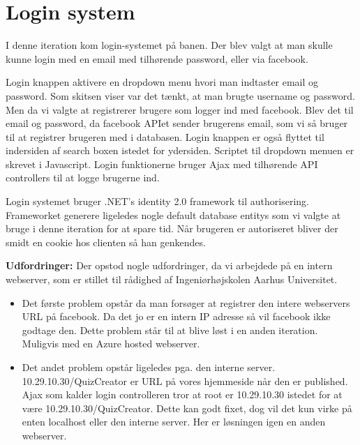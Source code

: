 \chapter{Login system}

I denne iteration kom login-systemet på banen. Der blev valgt at man skulle kunne login med en email med tilhørende password, eller via facebook.


Login knappen aktivere en dropdown menu hvori man indtaster email og password. Som skitsen viser var det tænkt, at man brugte username og password. Men da vi valgte at registrerer brugere som logger ind med facebook. Blev det til email og password, da facebook APIet sender brugerens email, som vi så bruger til at registrer brugeren med i databasen. Login knappen er også flyttet til indersiden af search boxen istedet for ydersiden. Scriptet til dropdown menuen er skrevet i Javascript. Login funktionerne bruger Ajax med tilhørende API controllers til at logge brugerne ind.

Login systemet bruger .NET's identity 2.0 framework til authorisering. Frameworket generere ligeledes nogle default database entitys som vi valgte at bruge i denne iteration for at spare tid. Når brugeren er autoriseret bliver der smidt en cookie hos clienten så han genkendes.



\textbf{Udfordringer:} 
Der opstod nogle udfordringer, da vi arbejdede på en intern webserver, som er stillet til rådighed af Ingeniørhøjskolen Aarhus Universitet. 

\begin{itemize}
	\item Det første problem opstår da man forsøger at registrer den intere webservers URL på facebook. Da det jo er en intern IP adresse så vil facebook ikke godtage den. Dette problem står til at blive løst i en anden iteration. Muligvis med en Azure hosted webserver.
	\item Det andet problem opstår ligeledes pga. den interne server. 10.29.10.30/QuizCreator er URL på vores hjemmeside når den er published. Ajax som kalder login controlleren tror at root er 10.29.10.30 istedet for at være 10.29.10.30/QuizCreator. Dette kan godt fixet, dog vil det kun virke på enten localhost eller den interne server. Her er løsningen igen en anden webserver.
\end{itemize}